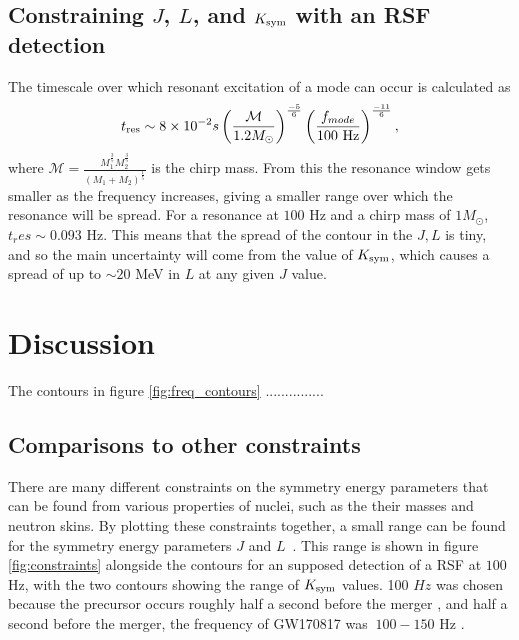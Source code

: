 \documentclass[fleqn,usenatbib]{mnras}
\begin{document}
\subsection{Constraining $J$, $L$, and $K_{\rm sym}$ with an RSF detection}
\hspace{\parindent}The timescale over which resonant excitation of a mode can occur is calculated as \cite{tsang2012resonant}
\begin{align}
t_{\rm res}\sim 8\times10^{-2}s\left(\frac{\mathcal{M}}{1.2M_{\odot}}\right)^{\frac{-5}{6}}\left(\frac{f_{mode}}{100 \text{ Hz}}\right)^{\frac{-11}{6}},
\label{res_timescale}    
\end{align}
\noindent where $\mathcal{M}=\frac{M_1^{\frac{3}{5}}M_2^{\frac{3}{5}}}{(M_1+M_2)^{\frac{1}{5}}}$ is the chirp mass. From this the resonance window gets smaller as the frequency increases, giving a smaller range over which the resonance will be spread. For a resonance at $100$ Hz and a chirp mass of $1M_{\odot}$, $t_res\sim 0.093$ Hz. This means that the spread of the contour in the $J,L$ is tiny, and so the main uncertainty will come from the value of $K_{\rm sym}$, which causes a spread of up to $\sim 20$ MeV in $L$ at any given $J$ value.




\section{Discussion}
The contours in figure \ref{fig:freq_contours} ...............




\subsection{Comparisons to other constraints}
\hspace{\parindent}There are many different constraints on the symmetry energy parameters that can be found from various properties of nuclei, such as the their masses %
and neutron skins. %
By plotting these constraints together, a small range can be found for the symmetry energy parameters $J$ and $L$~\cite{balantekin2014nuclear}. This range is shown in figure \ref{fig:constraints} alongside the contours for an supposed detection of a RSF at $100$ Hz, with the two contours showing the range of $K_{\rm sym}$ values. 100 $Hz$ was chosen because the precursor occurs roughly half a second before the merger \cite{zhong2019precursors}, and half a second before the merger, the frequency of GW170817 was $~100-150$ Hz \cite{abbott2017merger}.
\end{document}
